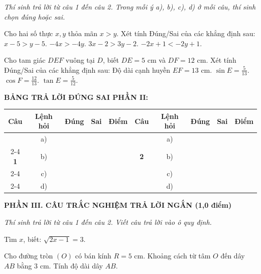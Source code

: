 \documentclass[12pt,a4paper]{article}
\begin{document}
\textit{Thí sinh trả lời từ câu 1 đến câu 2. Trong mỗi ý a), b), c), d) ở mỗi câu, thí sinh chọn đúng hoặc sai.}

\vspace{1mm}
\begin{ex}
Cho hai số thực $x, y$ thỏa mãn $x > y$. Xét tính Đúng/Sai của các khẳng định sau:
\choiceTF
{\True $x - 5 > y - 5$.}
{$-4x > -4y$.}
{\True $3x - 2 > 3y - 2$.}
{\True $-2x + 1 < -2y + 1$.}
\end{ex}

\begin{ex}
Cho tam giác $DEF$ vuông tại $D$, biết $DE = 5\text{ cm}$ và $DF = 12\text{ cm}$. Xét tính Đúng/Sai của các khẳng định sau:
\choiceTF
{\True Độ dài cạnh huyền $EF = 13\text{ cm}$.}
{$\sin E = \frac{5}{13}$.}
{\True $\cos F = \frac{12}{13}$.}
{$\tan E = \frac{5}{12}$.}
\end{ex}


\vspace{1mm}
\noindent\textbf{BẢNG TRẢ LỜI ĐÚNG SAI PHẦN II:}
\begin{center}
\begin{tabular}{|c|c|c|c|c||c|c|c|c|c|}
\hline
\textbf{Câu} & \textbf{Lệnh hỏi} & \textbf{Đúng} & \textbf{Sai} & \textbf{Điểm} & \textbf{Câu} & \textbf{Lệnh hỏi} & \textbf{Đúng} & \textbf{Sai} & \textbf{Điểm} \\
\hline
 & a) & & & & & a) & & & \\
\cline{2-4}\cline{7-9}
\textbf{1} & b) & & & & \textbf{2} & b) & & & \\
\cline{2-4}\cline{7-9}
 & c) & & & & & c) & & & \\
\cline{2-4}\cline{7-9}
 & d) & & & & & d) & & & \\
\hline
\end{tabular}
\end{center}
\vspace{2mm}

\noindent\textbf{\large PHẦN III. CÂU TRẮC NGHIỆM TRẢ LỜI NGẮN (1,0 điểm)}

\textit{Thí sinh trả lời từ câu 1 đến câu 2. Viết câu trả lời vào ô quy định.}

\vspace{1mm}
\begin{ex}
Tìm $x$, biết: $\sqrt{2x - 1} = 3$.
\end{ex}

\begin{ex}
Cho đường tròn $(O)$ có bán kính $R = 5\text{ cm}$. Khoảng cách từ tâm $O$ đến dây $AB$ bằng $3\text{ cm}$. Tính độ dài dây $AB$.
\end{ex}
\end{document}
